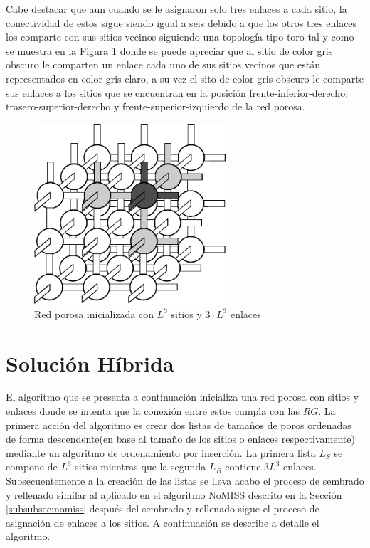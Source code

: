 Cabe destacar que aun cuando se le asignaron solo tres enlaces a cada sitio, la conectividad de estos sigue siendo igual a seis debido a que los otros tres enlaces los comparte con sus sitios vecinos siguiendo una topología tipo toro tal y como se muestra en la Figura \ref{fig:redinit} donde se puede apreciar que al sitio de color gris obscuro le comparten un enlace cada uno de sus sitios vecinos que están representados en color gris claro, a su vez el sito de color gris obscuro le comparte sus enlaces a los sitios que se encuentran en la posición frente-inferior-derecho, trasero-superior-derecho y frente-superior-izquierdo de la red porosa.


\begin{figure}[hbtp]
\centering
\includegraphics[width=2.8in]{img/red2.pdf}
\caption{Red porosa inicializada con $L^3$ sitios y $3 \cdot L^3$ enlaces}
\label{fig:redinit}
\end{figure}

\section{Solución Híbrida}
\label{sec:hybrid}
El algoritmo que se presenta a continuación inicializa una red porosa con sitios y enlaces donde se intenta que la conexi\'on entre estos cumpla con las $RG$. La primera acción del algoritmo es crear dos listas de tamaños de poros ordenadas de forma descendente(en base al tamaño de los sitios o enlaces respectivamente) mediante un algoritmo de ordenamiento por inserción. La primera lista $L_S$ se compone de $L^3$ sitios mientras que la segunda $L_B$ contiene $3L^3$ enlaces. Subsecuentemente a la creaci\'on de  las listas se lleva acabo el proceso de sembrado y rellenado similar al aplicado en el algoritmo NoMISS descrito en la Sección \ref{subsubsec:nomiss} después del sembrado y rellenado sigue el proceso de asignación de enlaces a los sitios. A continuación se describe a detalle el algoritmo.

